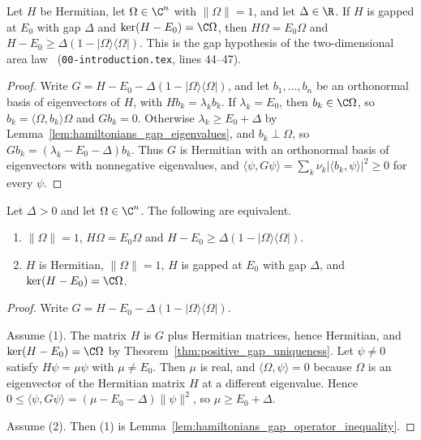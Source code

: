 \begin{lemma}
    \label{lem:hamiltonians_gap_operator_inequality}
    \leanok
    Let $H$ be Hermitian, let $\Omega\in\C^n$ with $\lVert\Omega\rVert=1$, and let
    $\Delta\in\R$. If $H$ is gapped at $E_0$ with gap $\Delta$ and
    $\ker(H-E_0)=\C\Omega$, then $H\Omega=E_0\Omega$ and
    $H-E_0\ge\Delta(1-\lvert\Omega\rangle\langle\Omega\rvert)$. This is the gap
    hypothesis of the two-dimensional area law~\cite{OpenAI2026AreaLaw}
    (\texttt{00-introduction.tex}, lines 44--47).
\end{lemma}
\begin{proof}\leanok
    Write $G=H-E_0-\Delta(1-\lvert\Omega\rangle\langle\Omega\rvert)$, and let
    $b_1,\dots,b_n$ be an orthonormal basis of eigenvectors of $H$, with
    $Hb_k=\lambda_kb_k$. If $\lambda_k=E_0$, then $b_k\in\C\Omega$, so
    $b_k=\langle\Omega,b_k\rangle\Omega$ and $Gb_k=0$. Otherwise
    $\lambda_k\ge E_0+\Delta$ by Lemma~\ref{lem:hamiltonians_gap_eigenvalues}, and
    $b_k\perp\Omega$, so $Gb_k=(\lambda_k-E_0-\Delta)b_k$. Thus $G$ is Hermitian with an
    orthonormal basis of eigenvectors with nonnegative eigenvalues, and
    $\langle\psi,G\psi\rangle=\sum_k\nu_k\lvert\langle b_k,\psi\rangle\rvert^2\ge0$ for
    every $\psi$.
\end{proof}

\begin{theorem}
    \label{thm:hamiltonians_gapped_unique}
    \leanok
    Let $\Delta>0$ and let $\Omega\in\C^n$. The following are equivalent.
    \begin{enumerate}
        \item $\lVert\Omega\rVert=1$, $H\Omega=E_0\Omega$ and
              $H-E_0\ge\Delta(1-\lvert\Omega\rangle\langle\Omega\rvert)$.
        \item $H$ is Hermitian, $\lVert\Omega\rVert=1$, $H$ is gapped at $E_0$
              with gap $\Delta$, and $\ker(H-E_0)=\C\Omega$.
    \end{enumerate}
\end{theorem}
\begin{proof}\leanok
    Write $G=H-E_0-\Delta(1-\lvert\Omega\rangle\langle\Omega\rvert)$.

    Assume (1). The matrix $H$ is $G$ plus Hermitian matrices, hence Hermitian,
    and $\ker(H-E_0)=\C\Omega$ by
    Theorem~\ref{thm:positive_gap_uniqueness}. Let $\psi\neq0$ satisfy
    $H\psi=\mu\psi$ with $\mu\neq E_0$. Then $\mu$ is real, and
    $\langle\Omega,\psi\rangle=0$ because $\Omega$ is an eigenvector of the
    Hermitian matrix $H$ at a different eigenvalue. Hence
    $0\le\langle\psi,G\psi\rangle=(\mu-E_0-\Delta)\lVert\psi\rVert^2$, so
    $\mu\ge E_0+\Delta$.

    Assume (2). Then (1) is
    Lemma~\ref{lem:hamiltonians_gap_operator_inequality}.
\end{proof}

